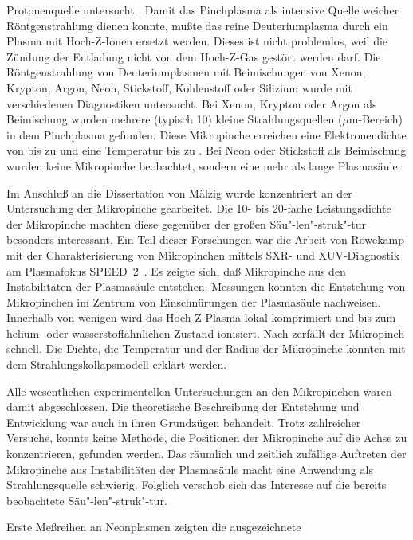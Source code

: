 Protonenquelle untersucht \cite{calker:phd}. Damit das Pinchplasma
als intensive Quelle weicher Röntgenstrahlung dienen konnte, mußte
das reine Deuteriumplasma durch ein Plasma mit Hoch-Z-Ionen
ersetzt werden. Dieses ist nicht problemlos, weil die Zündung der
Entladung nicht von dem Hoch-Z-Gas gestört werden darf. Die
Röntgenstrahlung von Deuteriumplasmen mit Beimischungen von Xenon,
Krypton, Argon, Neon, Stickstoff, Kohlenstoff oder Silizium wurde
mit verschiedenen Diagnostiken untersucht. Bei Xenon, Krypton oder
Argon als Beimischung wurden mehrere (typisch 10) kleine
Strahlungsquellen ($\mu$m-Bereich) in dem Pinchplasma gefunden.
Diese Mikropinche erreichen eine Elektronendichte von bis zu
 und eine Temperatur bis zu .
Bei Neon oder Stickstoff als Beimischung wurden keine Mikropinche
beobachtet, sondern eine mehr als  lange Plasmasäule.
\par
Im Anschluß an die Dissertation von Mälzig \cite{maelzig:phd}
wurde konzentriert an der Untersuchung der Mikropinche gearbeitet.
Die 10- bis 20-fache Leistungsdichte der Mikropinche machten diese
gegenüber der großen Säu"-len"-struk"-tur besonders interessant.
Ein Teil dieser Forschungen war die Arbeit von Röwekamp mit der
\glqq Charakterisierung von Mikropinchen mittels SXR- und
XUV-Diagnostik am Plasmafokus SPEED~2\grqq\ \cite{roewe:phd}. Es
zeigte sich, daß Mikropinche aus den Instabilitäten der
Plasmasäule entstehen. Messungen konnten die Entstehung von
Mikropinchen im Zentrum von Einschnürungen der Plasmasäule
nachweisen. Innerhalb von wenigen  wird das
Hoch-Z-Plasma lokal komprimiert und bis zum helium- oder
wasserstoffähnlichen Zustand ionisiert. Nach 
zerfällt der Mikropinch schnell. Die Dichte, die Temperatur und
der Radius der Mikropinche konnten mit dem Strahlungskollapsmodell
erklärt werden.
\par
Alle wesentlichen experimentellen Untersuchungen an den
Mikropinchen waren damit abgeschlossen. Die theoretische
Beschreibung der Entstehung und Entwicklung war auch in ihren
Grundzügen behandelt. Trotz zahlreicher Versuche, konnte keine
Methode, die Positionen der Mikropinche auf die Achse zu
konzentrieren, gefunden werden. Das räumlich und zeitlich
zufällige Auftreten der Mikropinche aus Instabilitäten der
Plasmasäule macht eine Anwendung als Strahlungsquelle schwierig.
Folglich verschob sich das Interesse auf die bereits beobachtete
Säu"-len"-struk"-tur.
\par
Erste Meßreihen an Neonplasmen zeigten die ausgezeichnete
